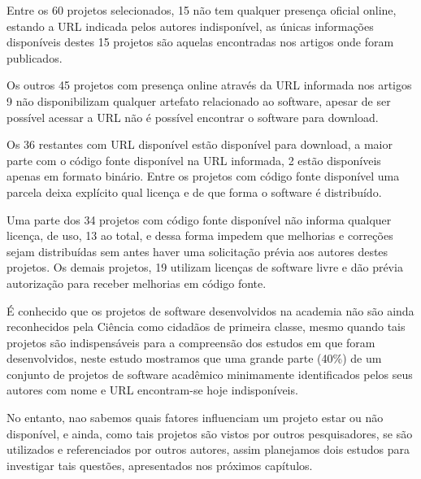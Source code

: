 Entre os 60 projetos selecionados, 15 não tem qualquer presença oficial online,
estando a URL indicada pelos autores indisponível, as únicas informações
disponíveis destes 15 projetos são aquelas encontradas nos artigos onde foram
publicados.

Os outros 45 projetos com presença online através da URL informada nos artigos
9 não disponibilizam qualquer artefato relacionado ao software, apesar de ser
possível acessar a URL não é possível encontrar o software para download.

Os 36 restantes com URL disponível estão disponível para download, a maior
parte com o código fonte disponível na URL informada, 2 estão disponíveis
apenas em formato binário. Entre os projetos com código fonte disponível
uma parcela deixa explícito qual licença e de que forma o software é
distribuído.

Uma parte dos 34 projetos com código fonte disponível não informa qualquer
licença, de uso, 13 ao total, e dessa forma impedem que melhorias e correções
sejam distribuídas sem antes haver uma solicitação prévia aos autores destes
projetos. Os demais projetos, 19 utilizam licenças de software livre e dão
prévia autorização para receber melhorias em código fonte.

É conhecido que os projetos de software desenvolvidos na academia não são ainda
reconhecidos pela Ciência como cidadãos de primeira classe, mesmo quando tais
projetos são indispensáveis para a compreensão dos estudos em que foram
desenvolvidos, neste estudo mostramos que uma grande parte (40\%) de um
conjunto de projetos de software acadêmico minimamente identificados pelos seus
autores com nome e URL encontram-se hoje indisponíveis.

No entanto, nao sabemos quais fatores influenciam um projeto estar ou não
disponível, e ainda, como tais projetos são vistos por outros pesquisadores, se
são utilizados e referenciados por outros autores, assim planejamos dois
estudos para investigar tais questões, apresentados nos próximos capítulos.






